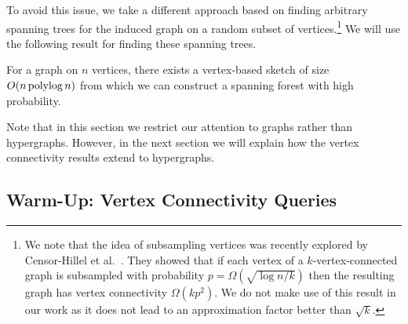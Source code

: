 %
%




To avoid this issue, we take a different approach based on finding arbitrary spanning trees for the induced graph on a random subset of vertices.\footnote{We note that the idea of subsampling vertices
 was recently explored by Censor-Hillel et al.~\cite{Censor-HillelGK14,Censor-HillelGGHK15}. They showed that if each vertex of a $k$-vertex-connected graph is subsampled with probability $p=\Omega(\sqrt{\log n / k})$ then the resulting graph has vertex connectivity $\Omega(kp^2)$. We do not make use of this result in our work as it does not lead to an approximation factor better than $\sqrt{k}$.
} We will use the following result for finding these spanning trees.

\begin{theorem}\label{thm:spantree}
For a graph on $n$ vertices, there exists a vertex-based sketch of size $O(n\operatorname{polylog} n)$ from which we can construct a spanning forest with high probability.
\end{theorem}


Note that in this section we restrict our attention to graphs rather than hypergraphs. However, in the next section we will explain how the vertex connectivity results extend to hypergraphs.

\subsection{Warm-Up: Vertex Connectivity Queries }

